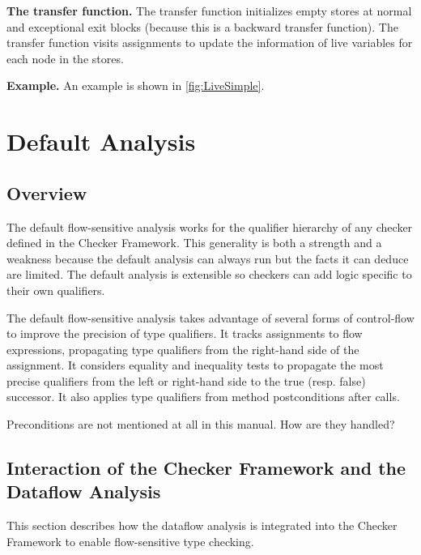 \textbf{The transfer function.} The transfer function 
initializes empty stores at normal and exceptional exit blocks (because this
is a backward transfer function). The transfer function visits assignments to
update the information of live variables for each node in the stores.

\textbf{Example.} An example is shown in \autoref{fig:LiveSimple}.



\section{Default Analysis}


\subsection{Overview}

The default flow-sensitive analysis 
works for the qualifier hierarchy of any checker defined in the
Checker Framework.  This generality is both a strength and a weakness
because the default analysis can always run but the facts it can
deduce are limited.  The default analysis is extensible so checkers
can add logic specific to their own qualifiers.

The default flow-sensitive analysis takes advantage of several forms
of control-flow to improve the precision of type qualifiers.  It
tracks assignments to flow expressions, propagating type qualifiers
from the right-hand side of the assignment.  It considers equality and
inequality tests to propagate the most precise qualifiers from the
left or right-hand side to the true (resp. false) successor.  It also
applies type qualifiers from method postconditions after calls.

\begin{workinprogress}
Preconditions are not mentioned at all in this manual. How are they handled?
\end{workinprogress}


\subsection{Interaction of the Checker Framework and the Dataflow Analysis}
\label{sec:flow-cf-interaction}

This section describes how the dataflow analysis is integrated into the
Checker Framework to enable flow-sensitive type checking.


